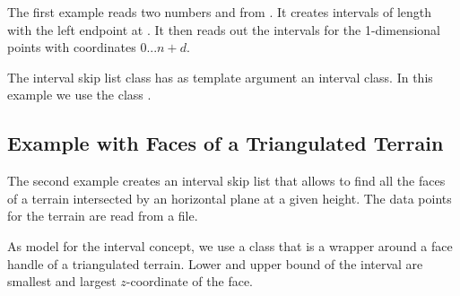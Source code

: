The first example reads two numbers  and  from .
It creates  intervals of length  with the left endpoint at .
It then reads out the intervals for the 1-dimensional points with
coordinates $0 ... n+d$. 

The interval skip list class has as template argument an interval
class. In this example we use the class .

\newpage
{}

\subsection{Example with Faces of a Triangulated Terrain}



The second example creates an interval skip list that allows to find all the faces
of a terrain intersected by an horizontal plane at a given height.
The data points for the terrain are  read from a file. 

As model for the interval concept, we use a class that is a wrapper
around a face handle of a triangulated terrain. Lower and upper bound
of the interval are smallest and largest $z$-coordinate of the face.




%




